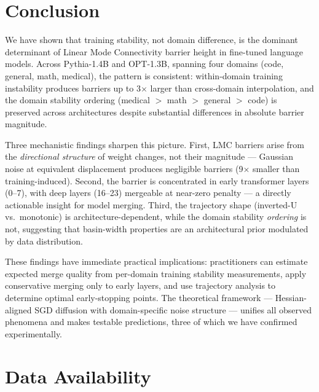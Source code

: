 \documentclass[11pt,a4paper]{article}
\begin{document}
\section{Conclusion}

We have shown that training stability, not domain difference, is the dominant determinant of Linear Mode Connectivity barrier height in fine-tuned language models. Across Pythia-1.4B and OPT-1.3B, spanning four domains (code, general, math, medical), the pattern is consistent: within-domain training instability produces barriers up to 3$\times$ larger than cross-domain interpolation, and the domain stability ordering (medical $>$ math $>$ general $>$ code) is preserved across architectures despite substantial differences in absolute barrier magnitude.

Three mechanistic findings sharpen this picture. First, LMC barriers arise from the \emph{directional structure} of weight changes, not their magnitude — Gaussian noise at equivalent displacement produces negligible barriers (9$\times$ smaller than training-induced). Second, the barrier is concentrated in early transformer layers (0--7), with deep layers (16--23) mergeable at near-zero penalty — a directly actionable insight for model merging. Third, the trajectory shape (inverted-U vs.\ monotonic) is architecture-dependent, while the domain stability \emph{ordering} is not, suggesting that basin-width properties are an architectural prior modulated by data distribution.

These findings have immediate practical implications: practitioners can estimate expected merge quality from per-domain training stability measurements, apply conservative merging only to early layers, and use trajectory analysis to determine optimal early-stopping points. The theoretical framework — Hessian-aligned SGD diffusion with domain-specific noise structure — unifies all observed phenomena and makes testable predictions, three of which we have confirmed experimentally.

\section*{Data Availability}
\end{document}
